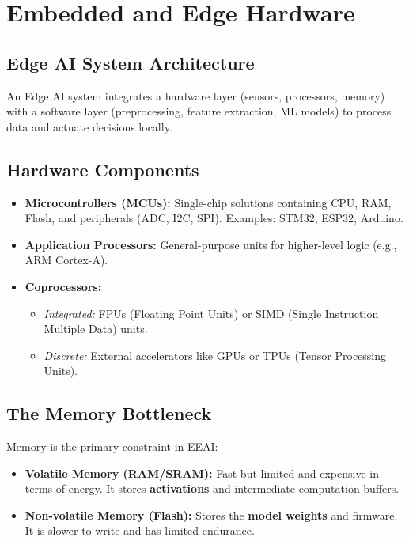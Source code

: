 \section{Embedded and Edge Hardware}

\subsection{Edge AI System Architecture}
An Edge AI system integrates a hardware layer (sensors, processors, memory) with a software layer (preprocessing, feature extraction, ML models) to process data and actuate decisions locally.

\subsection{Hardware Components}
\begin{itemize}
    \item \textbf{Microcontrollers (MCUs):} Single-chip solutions containing CPU, RAM, Flash, and peripherals (ADC, I2C, SPI). Examples: STM32, ESP32, Arduino.
    \item \textbf{Application Processors:} General-purpose units for higher-level logic (e.g., ARM Cortex-A).
    \item \textbf{Coprocessors:}
    \begin{itemize}
        \item \textit{Integrated:} FPUs (Floating Point Units) or SIMD (Single Instruction Multiple Data) units.
        \item \textit{Discrete:} External accelerators like GPUs or TPUs (Tensor Processing Units).
    \end{itemize}
\end{itemize}

\subsection{The Memory Bottleneck}
Memory is the primary constraint in EEAI:
\begin{itemize}
    \item \textbf{Volatile Memory (RAM/SRAM):} Fast but limited and expensive in terms of energy. It stores \textbf{activations} and intermediate computation buffers.
    \item \textbf{Non-volatile Memory (Flash):} Stores the \textbf{model weights} and firmware. It is slower to write and has limited endurance.
\end{itemize}


